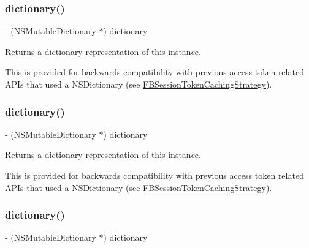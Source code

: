 \subsubsection{\texorpdfstring{dictionary()}{dictionary()}\hspace{0.1cm}{\footnotesize\ttfamily [1/5]}}
{\footnotesize\ttfamily -\/ (N\+S\+Mutable\+Dictionary $\ast$) dictionary \begin{DoxyParamCaption}{ }\end{DoxyParamCaption}}

Returns a dictionary representation of this instance.

This is provided for backwards compatibility with previous access token related A\+P\+Is that used a N\+S\+Dictionary (see {\ttfamily \hyperlink{interfaceFBSessionTokenCachingStrategy}{F\+B\+Session\+Token\+Caching\+Strategy}}). \mbox{\label{interfaceFBAccessTokenData_aca74d0fd769aea62fb70912bec9aba4d}} 
\subsubsection{\texorpdfstring{dictionary()}{dictionary()}\hspace{0.1cm}{\footnotesize\ttfamily [2/5]}}
{\footnotesize\ttfamily -\/ (N\+S\+Mutable\+Dictionary $\ast$) dictionary \begin{DoxyParamCaption}{ }\end{DoxyParamCaption}}

Returns a dictionary representation of this instance.

This is provided for backwards compatibility with previous access token related A\+P\+Is that used a N\+S\+Dictionary (see {\ttfamily \hyperlink{interfaceFBSessionTokenCachingStrategy}{F\+B\+Session\+Token\+Caching\+Strategy}}). \mbox{\label{interfaceFBAccessTokenData_aca74d0fd769aea62fb70912bec9aba4d}} 
\subsubsection{\texorpdfstring{dictionary()}{dictionary()}\hspace{0.1cm}{\footnotesize\ttfamily [3/5]}}
{\footnotesize\ttfamily -\/ (N\+S\+Mutable\+Dictionary $\ast$) dictionary \begin{DoxyParamCaption}{ }\end{DoxyParamCaption}}


